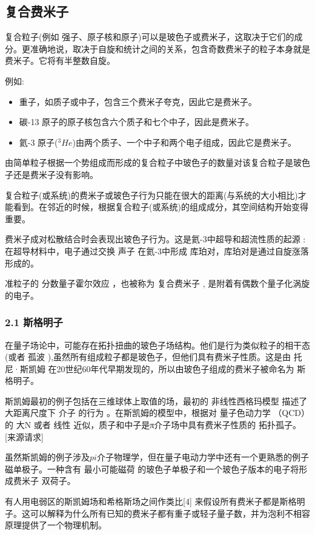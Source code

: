 \subsection{ 复合费米子}
复合粒子(例如 强子、原子核和原子)可以是玻色子或费米子，这取决于它们的成分。更准确地说，取决于自旋和统计之间的关系，包含奇数费米子的粒子本身就是费米子。它将有半整数自旋。

例如:
\begin{itemize}
\item 重子，如质子或中子，包含三个费米子夸克，因此它是费米子。
\item 碳-13 原子的原子核包含六个质子和七个中子，因此是费米子。
\item 氦-3 原子($^3He$)由两个质子、一个中子和两个电子组成，因此它是费米子。
\end{itemize}
由简单粒子根据一个势组成而形成的复合粒子中玻色子的数量对该复合粒子是玻色子还是费米子没有影响。

复合粒子(或系统)的费米子或玻色子行为只能在很大的距离(与系统的大小相比)才能看到。在邻近的时候，根据复合粒子(或系统)的组成成分，其空间结构开始变得重要。

费米子成对松散结合时会表现出玻色子行为。这是氦-3中超导和超流性质的起源 :在超导材料中，电子通过交换 声子 在氦-3中形成 库珀对，库珀对是通过自旋涨落形成的。

准粒子的 分数量子霍尔效应 ，也被称为 复合费米子 , 是附着有偶数个量子化涡旋的电子。

\subsubsection{2.1 斯格明子}
在量子场论中，可能存在拓扑扭曲的玻色子场结构。他们是行为类似粒子的相干态(或者 孤波 ),虽然所有组成粒子都是玻色子，但他们具有费米子性质。这是由 托尼·斯凯姆 在20世纪60年代早期发现的，所以由玻色子组成的费米子被命名为 斯格明子。

斯凯姆最初的例子包括在三维球体上取值的场，最初的 非线性西格玛模型 描述了大距离尺度下 介子 的行为 。在斯凯姆的模型中，根据对 量子色动力学 （QCD）的 大N 或者 线性 近似，质子和中子是π介子场中具有费米子性质的 拓扑孤子。[来源请求]

虽然斯凯姆的例子涉及$pi$介子物理学，但在量子电动力学中还有一个更熟悉的例子 磁单极子。一种含有 最小可能磁荷 的玻色子单极子和一个玻色子版本的电子将形成费米子 双荷子。

有人用电弱区的斯凯姆场和希格斯场之间作类比[4] 来假设所有费米子都是斯格明子。这可以解释为什么所有已知的费米子都有重子或轻子量子数，并为泡利不相容原理提供了一个物理机制。

